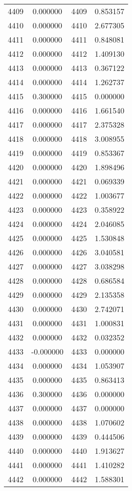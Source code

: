 \documentclass[12pt]{article}
\begin{document}
\begin{longtable}{@{}cccc@{}}
4409 & 0.000000 & 4409 & 0.853157 \\
4410 & 0.000000 & 4410 & 2.677305 \\
4411 & 0.000000 & 4411 & 0.848081 \\
4412 & 0.000000 & 4412 & 1.409130 \\
4413 & 0.000000 & 4413 & 0.367122 \\
4414 & 0.000000 & 4414 & 1.262737 \\
4415 & 0.300000 & 4415 & 0.000000 \\
4416 & 0.000000 & 4416 & 1.661540 \\
4417 & 0.000000 & 4417 & 2.375328 \\
4418 & 0.000000 & 4418 & 3.008955 \\
4419 & 0.000000 & 4419 & 0.853367 \\
4420 & 0.000000 & 4420 & 1.898496 \\
4421 & 0.000000 & 4421 & 0.069339 \\
4422 & 0.000000 & 4422 & 1.003677 \\
4423 & 0.000000 & 4423 & 0.358922 \\
4424 & 0.000000 & 4424 & 2.046085 \\
4425 & 0.000000 & 4425 & 1.530848 \\
4426 & 0.000000 & 4426 & 3.040581 \\
4427 & 0.000000 & 4427 & 3.038298 \\
4428 & 0.000000 & 4428 & 0.686584 \\
4429 & 0.000000 & 4429 & 2.135358 \\
4430 & 0.000000 & 4430 & 2.742071 \\
4431 & 0.000000 & 4431 & 1.000831 \\
4432 & 0.000000 & 4432 & 0.032352 \\
4433 & -0.000000 & 4433 & 0.000000 \\
4434 & 0.000000 & 4434 & 1.053907 \\
4435 & 0.000000 & 4435 & 0.863413 \\
4436 & 0.300000 & 4436 & 0.000000 \\
4437 & 0.000000 & 4437 & 0.000000 \\
4438 & 0.000000 & 4438 & 1.070602 \\
4439 & 0.000000 & 4439 & 0.444506 \\
4440 & 0.000000 & 4440 & 1.913627 \\
4441 & 0.000000 & 4441 & 1.410282 \\
4442 & 0.000000 & 4442 & 1.588301 \\

\end{longtable}
\end{document}
